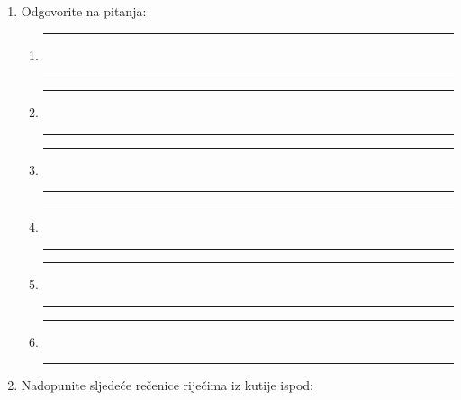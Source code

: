 \documentclass[a5paper, 10pt]{tekst}
\begin{document}
\begin{enumerate}
		\item Odgovorite na pitanja:
		\begin{enumerate}[label=(\roman*)]
			\raggedright
			\item\vspace{0.5em}
			\rule{\linewidth}{0.5pt}\\[0.6em]
			\rule{\linewidth}{0.5pt}
			\item\vspace{0.5em}
			\rule{\linewidth}{0.5pt}\\[0.6em]
			\rule{\linewidth}{0.5pt}
			\item\vspace{0.5em}
			\rule{\linewidth}{0.5pt}\\[0.6em]
			\rule{\linewidth}{0.5pt}
			\item\vspace{0.5em}
			\rule{\linewidth}{0.5pt}\\[0.6em]
			\rule{\linewidth}{0.5pt}
			\item\vspace{0.5em}
			\rule{\linewidth}{0.5pt}\\[0.6em]
			\rule{\linewidth}{0.5pt}
			\item\vspace{0.5em}
			\rule{\linewidth}{0.5pt}\\[0.6em]
			\rule{\linewidth}{0.5pt}
		\end{enumerate}		
		\item Nadopunite sljedeće rečenice riječima iz kutije ispod:
		\begin{center}
		\end{center}
		\begin{enumerate}[label=(\roman*)]
			\raggedright
			

\end{enumerate}
\end{enumerate}
\end{document}
